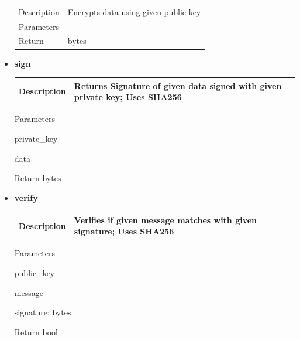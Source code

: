 \documentclass[11pt]{article}
\begin{document}
\begin{itemize}
  \begin{longtable}[]{@{}ll@{}}
  \toprule
  \endhead
  Description & Encrypts data using given public key\tabularnewline
  Parameters &\tabularnewline
  Return & bytes\tabularnewline
  \bottomrule
  \end{longtable}
\item
  \textbf{sign}

  \begin{longtable}[]{@{}ll@{}}
  \toprule
  \endhead
  \begin{minipage}[t]{0.40\columnwidth}\raggedright
  Description\strut
  \end{minipage} & \begin{minipage}[t]{0.54\columnwidth}\raggedright
  Returns Signature of given data signed with given private key; Uses
  SHA256\strut
  \end{minipage}\tabularnewline
  \bottomrule
  \end{longtable}

  \textbar Parameters\textbar{}

  private\_key

  data

  \textbar Return \textbar{} bytes \textbar{}
\item
  \textbf{verify}

  \begin{longtable}[]{@{}ll@{}}
  \toprule
  \endhead
  \begin{minipage}[t]{0.40\columnwidth}\raggedright
  Description\strut
  \end{minipage} & \begin{minipage}[t]{0.54\columnwidth}\raggedright
  Verifies if given message matches with given signature; Uses
  SHA256\strut
  \end{minipage}\tabularnewline
  \bottomrule
  \end{longtable}

  \textbar Parameters\textbar{}

  public\_key

  message

  signature: bytes

  \textbar Return \textbar{} bool \textbar{}
\end{itemize}
\end{document}
